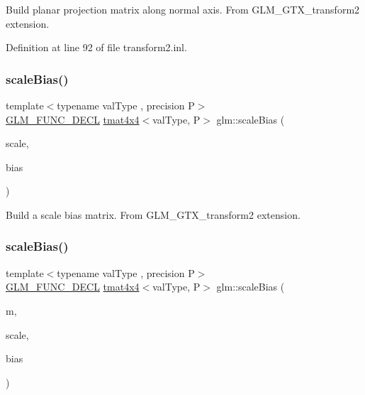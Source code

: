 Build planar projection matrix along normal axis. From G\+L\+M\+\_\+\+G\+T\+X\+\_\+transform2 extension. 

Definition at line 92 of file transform2.\+inl.

\mbox{\label{group__gtx__transform2_ga2874abd228989556d610a0bff993667a}} 
\subsubsection{\texorpdfstring{scaleBias()}{scaleBias()}\hspace{0.1cm}{\footnotesize\ttfamily [1/2]}}
{\footnotesize\ttfamily template$<$typename val\+Type , precision P$>$ \\
\mbox{\hyperlink{setup_8hpp_ab2d052de21a70539923e9bcbf6e83a51}{G\+L\+M\+\_\+\+F\+U\+N\+C\+\_\+\+D\+E\+CL}} \mbox{\hyperlink{structglm_1_1tmat4x4}{tmat4x4}}$<$val\+Type, P$>$ glm\+::scale\+Bias (\begin{DoxyParamCaption}\item[{val\+Type}]{scale,  }\item[{val\+Type}]{bias }\end{DoxyParamCaption})}

Build a scale bias matrix. From G\+L\+M\+\_\+\+G\+T\+X\+\_\+transform2 extension. \mbox{\label{group__gtx__transform2_gac1a1139e2980021422d1fc1c42dc74f2}} 
\subsubsection{\texorpdfstring{scaleBias()}{scaleBias()}\hspace{0.1cm}{\footnotesize\ttfamily [2/2]}}
{\footnotesize\ttfamily template$<$typename val\+Type , precision P$>$ \\
\mbox{\hyperlink{setup_8hpp_ab2d052de21a70539923e9bcbf6e83a51}{G\+L\+M\+\_\+\+F\+U\+N\+C\+\_\+\+D\+E\+CL}} \mbox{\hyperlink{structglm_1_1tmat4x4}{tmat4x4}}$<$val\+Type, P$>$ glm\+::scale\+Bias (\begin{DoxyParamCaption}\item[{\mbox{\hyperlink{structglm_1_1tmat4x4}{tmat4x4}}$<$ val\+Type, P $>$ const \&}]{m,  }\item[{val\+Type}]{scale,  }\item[{val\+Type}]{bias }\end{DoxyParamCaption})}

